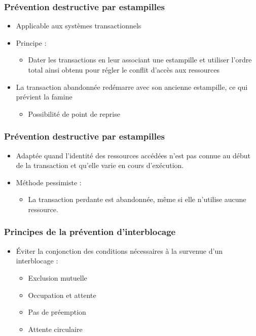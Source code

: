 \begin{frame}
\frametitle{Prévention destructive par estampilles}
\begin{itemize}
\item Applicable aux systèmes transactionnels
\item Principe :
\begin{itemize}
\item Dater les transactions en leur associant une estampille et utiliser l'ordre total ainsi obtenu pour régler le conflit d'accès aux ressources
\end{itemize}
\item La transaction abandonnée redémarre avec son ancienne estampille, ce qui prévient la famine
\begin{itemize}
\item Possibilité de point de reprise
\end{itemize}
\end{itemize}
\end{frame}

\begin{frame}
\frametitle{Prévention destructive par estampilles}
\begin{itemize}
\item Adaptée quand l'identité des ressources accédées n'est pas connue au début de la transaction et qu'elle varie en cours d’exécution.
\item Méthode pessimiste :
\begin{itemize}
\item La transaction perdante est abandonnée, même si elle n'utilise aucune ressource.
\end{itemize}
\end{itemize}
\end{frame}

\begin{frame}
\frametitle{Principes de la prévention d’interblocage}
\begin{itemize}
\item Éviter la conjonction des conditions nécessaires à la survenue d’un interblocage :
\begin{itemize}
\item Exclusion mutuelle
\item Occupation et attente
\item Pas de préemption
\item Attente circulaire
\end{itemize}
\end{itemize}
\end{frame}

